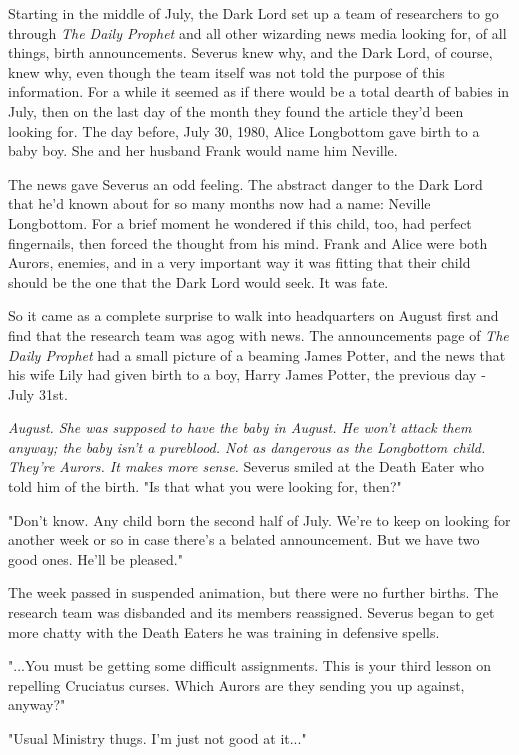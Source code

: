 \documentclass[a4paper,11pt]{article}
\begin{document}
Starting in the middle of July, the Dark Lord set up a team of researchers to go through \emph{The Daily Prophet} and all other wizarding news media looking for, of all things, birth announcements. Severus knew why, and the Dark Lord, of course, knew why, even though the team itself was not told the purpose of this information. For a while it seemed as if there would be a total dearth of babies in July, then on the last day of the month they found the article they'd been looking for. The day before, July 30, 1980, Alice Longbottom gave birth to a baby boy. She and her husband Frank would name him Neville.

The news gave Severus an odd feeling. The abstract danger to the Dark Lord that he'd known about for so many months now had a name: Neville Longbottom. For a brief moment he wondered if this child, too, had perfect fingernails, then forced the thought from his mind. Frank and Alice were both Aurors, enemies, and in a very important way it was fitting that their child should be the one that the Dark Lord would seek. It was fate.

So it came as a complete surprise to walk into headquarters on August first and find that the research team was agog with news. The announcements page of \emph{The Daily Prophet} had a small picture of a beaming James Potter, and the news that his wife Lily had given birth to a boy, Harry James Potter, the previous day - July 31st.

\emph{August. She was supposed to have the baby in August. He won't attack them anyway; the baby isn't a pureblood. Not as dangerous as the Longbottom child. They're Aurors. It makes more sense.} Severus smiled at the Death Eater who told him of the birth. "Is that what you were looking for, then?"

"Don't know. Any child born the second half of July. We're to keep on looking for another week or so in case there's a belated announcement. But we have two good ones. He'll be pleased."

The week passed in suspended animation, but there were no further births. The research team was disbanded and its members reassigned. Severus began to get more chatty with the Death Eaters he was training in defensive spells.

"...You must be getting some difficult assignments. This is your third lesson on repelling Cruciatus curses. Which Aurors are they sending you up against, anyway?"

"Usual Ministry thugs. I'm just not good at it..."
\end{document}
